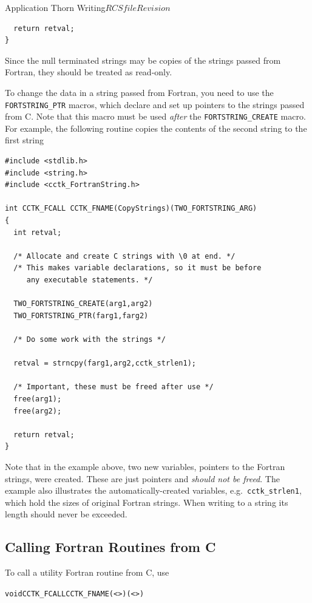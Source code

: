 \begin{cactuspart}{Application Thorn Writing}{$RCSfile$}{$Revision$}
\begin{verbatim}
  return retval;
}

\end{verbatim}

Since the null terminated strings may be copies of the strings passed
from Fortran, they should be treated as read-only.

To change the data in a string passed from Fortran, you need to use
the \texttt{FORTSTRING\_PTR} macros, which declare and set up pointers
to the strings passed from C. Note that this macro must be used
\emph{after} the \texttt{FORTSTRING\_CREATE} macro. For example, the
following routine copies the contents of the second string to the
first string

\begin{verbatim}
#include <stdlib.h>
#include <string.h>
#include <cctk_FortranString.h>

int CCTK_FCALL CCTK_FNAME(CopyStrings)(TWO_FORTSTRING_ARG)
{
  int retval;

  /* Allocate and create C strings with \0 at end. */
  /* This makes variable declarations, so it must be before
     any executable statements. */

  TWO_FORTSTRING_CREATE(arg1,arg2)
  TWO_FORTSTRING_PTR(farg1,farg2)

  /* Do some work with the strings */

  retval = strncpy(farg1,arg2,cctk_strlen1);

  /* Important, these must be freed after use */
  free(arg1);
  free(arg2);

  return retval;
}

\end{verbatim}

Note that in the example above, two new variables, pointers to the
Fortran strings, were created.  These are just pointers and
\emph{should not be freed}.  The example also illustrates the
automatically-created variables, e.g.\ \texttt{cctk\_strlen1},
which hold the sizes of original Fortran strings.
When writing to a string its length should never be exceeded.

\subsection{Calling Fortran Routines from C}
\label{sec:caforofr}

To call a utility Fortran routine from C, use
\begin{alltt}
void CCTK_FCALL CCTK_FNAME(<>)(<>)
\end{alltt}


\end{cactuspart}
